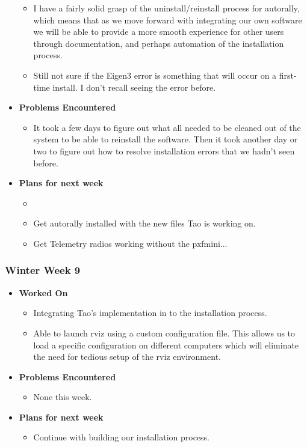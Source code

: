 \documentclass[compsoc,draftclsnofoot,onecolumn,10pt]{IEEEtran}
\begin{document}
\begin{itemize}
\begin{itemize}
    \item I have a fairly solid grasp of the uninstall/reinstall process for autorally, which means that as we move forward with integrating our own software we will be able to provide a more smooth experience for other users through documentation, and perhaps automation of the installation process.

    \item Still not sure if the Eigen3 error is something that will occur on a first-time install. I don't recall seeing the error before.

    \end{itemize}

    \item {\textbf{Problems Encountered}}
    \begin{itemize}
        \item It took a few days to figure out what all needed to be cleaned out of the system to be able to reinstall the software. Then it took another day or two to figure out how to resolve installation errors that we hadn't seen before.
    \end{itemize}

    \item{\textbf{Plans for next week}}
    \begin{itemize}
        \item         \item Get autorally installed with the new files Tao is working on.
        \item Get Telemetry radios working without the pxfmini...
    \end{itemize}
\end{itemize}

\subsubsection{Winter Week 9}
\begin{itemize}
    \item {\textbf{Worked On}}
    \begin{itemize}
        \item Integrating Tao's implementation in to the installation process.
        \item Able to launch rviz using a custom configuration file. This allows us to load a specific configuration on different computers which will eliminate the need for tedious setup of the rviz environment.
    \end{itemize}

    \item {\textbf{Problems Encountered}}
    \begin{itemize}
        \item None this week.
    \end{itemize}

    \item{\textbf{Plans for next week}}
    \begin{itemize}
        \item Continue with building our installation process.
    \end{itemize}
\end{itemize}
\end{document}

